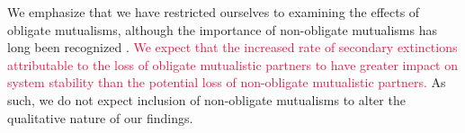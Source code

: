 \documentclass[twocolumn,preprintnumbers,amsmath,amssymb,superscriptaddress,linenumbers]{revtex4-1}
\newcommand{\rev}[1]{\textcolor{crimson}{#1}}
\begin{document}
We emphasize that we have restricted ourselves to examining the effects of obligate mutualisms, although the importance of non-obligate mutualisms has long been recognized \cite{Ramos2012,Vieira2015,Valdovinos2016,Ponisio2017,Valdovinos2019}.
\rev{We expect that the increased rate of secondary extinctions attributable to the loss of obligate mutualistic partners to have greater impact on system stability than the potential loss of non-obligate mutualistic partners.}
As such, we do not expect inclusion of non-obligate mutualisms to alter the qualitative nature of our findings.\\
\end{document}
